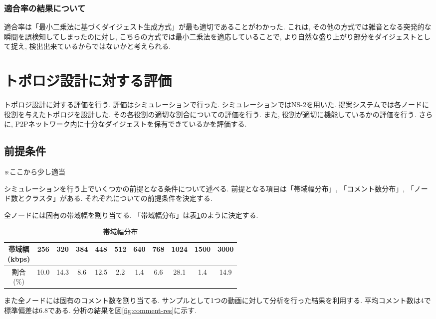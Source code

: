 \subsubsection{適合率の結果について}
適合率は「最小二乗法に基づくダイジェスト生成方式」が最も適切であることがわかった. これは, その他の方式では雑音となる突発的な瞬間を誤検知してしまったのに対し, こちらの方式では最小二乗法を適応していることで, より自然な盛り上がり部分をダイジェストとして捉え, 検出出来ているからではないかと考えられる.

\section{トポロジ設計に対する評価}
トポロジ設計に対する評価を行う. 評価はシミュレーションで行った. シミュレーションではNS-2を用いた. 提案システムでは各ノードに役割を与えたトポロジを設計した. その各役割の適切な割合についての評価を行う. また, 役割が適切に機能しているかの評価を行う. さらに, P2Pネットワーク内に十分なダイジェストを保有できているかを評価する.


\subsection{前提条件}
※ここから少し適当

シミュレーションを行う上でいくつかの前提となる条件について述べる. 前提となる項目は「帯域幅分布」, 「コメント数分布」, 「ノード数とクラスタ」がある. それぞれについての前提条件を決定する.

全ノードには固有の帯域幅を割り当てる. 「帯域幅分布」は表\ref{tbl:band-dist}のように決定する.

\begin{table}[h]
  \caption{帯域幅分布}
  \label{tbl:band-dist}
  \centering
      {\small
        \begin{tabular}{|c|c|c|c|c|c|c|c|c|c|c|} \hline
          \shortstack{帯域幅 \\ (kbps)} & 256 & 320 & 384 & 448 & 512 & 640 & 768 & 1024 & 1500 & 3000 \\ \hline
          \shortstack{割合 \\ (\%)} & 10.0 & 14.3 & 8.6 & 12.5 & 2.2 & 1.4 & 6.6 & 28.1 & 1.4 & 14.9 \\ \hline
        \end{tabular}
      }
\end{table}

また全ノードには固有のコメント数を割り当てる. サンプルとして1つの動画に対して分析を行った結果を利用する\cite{comment}. 平均コメント数は4で標準偏差は6.8である. 分析の結果を図\ref{fig:comment-res}に示す.

